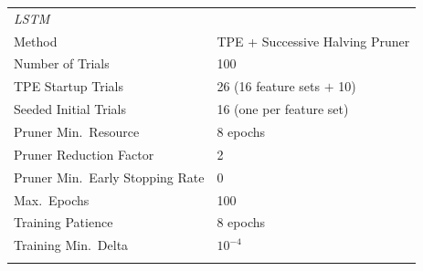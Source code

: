 \begin{table}[t]
{\begin{tabular}{ll}
        \midrule
        \multicolumn{2}{l}{\textit{LSTM}} \\
        Method              & TPE + Successive Halving Pruner \\
        Number of Trials    & 100 \\
        TPE Startup Trials  & 26 (16 feature sets $+$ 10) \\
        Seeded Initial Trials & 16 (one per feature set) \\
        Pruner Min.\ Resource & 8 epochs \\
        Pruner Reduction Factor & 2 \\
        Pruner Min.\ Early Stopping Rate & 0 \\
        Max.\ Epochs        & 100 \\
        Training Patience   & 8 epochs \\
        Training Min.\ Delta & $10^{-4}$ \\
        \bottomrule
        \vspace{-2pt}
    \end{tabular}
    }%
\end{table}









